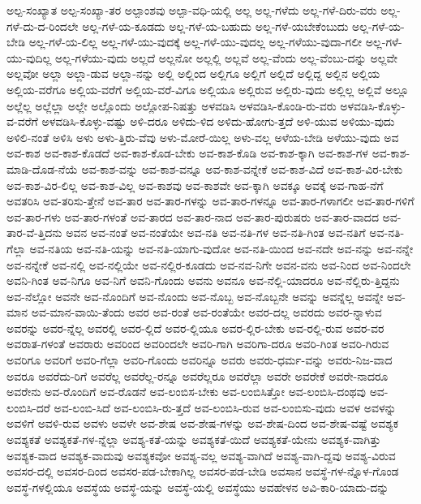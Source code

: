 {ಅಲ್ಪ-ಸಂಖ್ಯಾತ
ಅಲ್ಪ-ಸಂಖ್ಯಾ-ತರ
ಅಲ್ಪಾಂಶವು
ಅಲ್ಪಾ-ವಧಿ-ಯಲ್ಲಿ
ಅಲ್ಲ
ಅಲ್ಲ-ಗಳೆದು
ಅಲ್ಲ-ಗಳೆ-ದಿರು-ವರು
ಅಲ್ಲ-ಗಳೆ-ದು-ದ-ರಿಂದಲೇ
ಅಲ್ಲ-ಗಳೆ-ಯ-ಕೂಡದು
ಅಲ್ಲ-ಗಳೆ-ಯ-ಬಹುದು
ಅಲ್ಲ-ಗಳೆ-ಯಬೇಕೆಂಬುದು
ಅಲ್ಲ-ಗಳೆ-ಯ-ಬೇಡಿ
ಅಲ್ಲ-ಗಳೆ-ಯ-ಲಿಲ್ಲ
ಅಲ್ಲ-ಗಳೆ-ಯು-ವುದಕ್ಕೆ
ಅಲ್ಲ-ಗಳೆ-ಯು-ವುದಲ್ಲ
ಅಲ್ಲ-ಗಳೆಯು-ವುದಾ-ಗಲೀ
ಅಲ್ಲ-ಗಳೆ-ಯು-ವುದಿಲ್ಲ
ಅಲ್ಲ-ಗಳೆಯು-ವುದು
ಅಲ್ಲದೆ
ಅಲ್ಲನೋ
ಅಲ್ಲಲ್ಲಿ
ಅಲ್ಲವೆ
ಅಲ್ಲ-ವೆಂದು
ಅಲ್ಲ-ವೆಂಬು-ದನ್ನು
ಅಲ್ಲವೇ
ಅಲ್ಲವೋ
ಅಲ್ಲಾ
ಅಲ್ಲಾ-ಡುವ
ಅಲ್ಲಾ-ನನ್ನು
ಅಲ್ಲಿ
ಅಲ್ಲಿಂದ
ಅಲ್ಲಿಗೂ
ಅಲ್ಲಿಗೆ
ಅಲ್ಲಿದೆ
ಅಲ್ಲಿದ್ದ
ಅಲ್ಲಿನ
ಅಲ್ಲಿಯ
ಅಲ್ಲಿಯ-ವರೆಗೂ
ಅಲ್ಲಿಯ-ವರೆಗೆ
ಅಲ್ಲಿಯ-ವರೆ-ವಿಗೂ
ಅಲ್ಲಿಯೂ
ಅಲ್ಲಿರುವ
ಅಲ್ಲಿರು-ವುದು
ಅಲ್ಲಿಲ್ಲ
ಅಲ್ಲಿವೆ
ಅಲ್ಲೂ
ಅಲ್ಲೆಲ್ಲ
ಅಲ್ಲೆಲ್ಲಾ
ಅಲ್ಲೇ
ಅಲ್ಲೊಂದು
ಅಲ್ಲೋಪ-ನಿಷತ್ತು
ಅಳವಡಿಸಿ
ಅಳವಡಿಸಿ-ಕೊಂಡಿ-ರು-ವರು
ಅಳವಡಿಸಿ-ಕೊಳ್ಳು-ವ-ವರೆಗೆ
ಅಳವಡಿಸಿ-ಕೊಳ್ಳು-ವಷ್ಟು
ಅಳಿ-ದರೂ
ಅಳಿದು-ಳಿದ
ಅಳಿದು-ಹೋಗು-ತ್ತದೆ
ಅಳಿ-ಯುವ
ಅಳಿಯು-ವುದು
ಅಳಿಲಿ-ನಂತೆ
ಅಳಿಸಿ
ಅಳು
ಅಳು-ತ್ತಿರು-ವೆವು
ಅಳು-ಮೋರೆ-ಯಿಲ್ಲ
ಅಳು-ವಲ್ಲ
ಅಳೆಯ-ಬೇಡಿ
ಅಳೆಯು-ವುದು
ಅವ
ಅವ-ಕಾಶ
ಅವ-ಕಾಶ-ಕೊಡದೆ
ಅವ-ಕಾಶ-ಕೊಡ-ಬೇಕು
ಅವ-ಕಾಶ-ಕೊಡಿ
ಅವ-ಕಾಶ-ಕ್ಕಾಗಿ
ಅವ-ಕಾಶ-ಗಳ
ಅವ-ಕಾಶ-ಮಾಡಿ-ದೊಡ-ನೆಯೆ
ಅವ-ಕಾಶ-ವನ್ನು
ಅವ-ಕಾಶ-ವನ್ನೂ
ಅವ-ಕಾಶ-ವನ್ನೇಕೆ
ಅವ-ಕಾಶ-ವಿದೆ
ಅವ-ಕಾಶ-ವಿರ-ಬೇಕು
ಅವ-ಕಾಶ-ವಿರ-ಲಿಲ್ಲ
ಅವ-ಕಾಶ-ವಿಲ್ಲ
ಅವ-ಕಾಶವು
ಅವ-ಕಾಶವೇ
ಅವ-ಕ್ಕಾಗಿ
ಅವಕ್ಕೂ
ಅವಕ್ಕೆ
ಅವ-ಗಾಹ-ನೆಗೆ
ಅವತರಿಸಿ
ಅವ-ತರಿಸು-ತ್ತೇನೆ
ಅವ-ತಾರ
ಅವ-ತಾರ-ಗಳನ್ನು
ಅವ-ತಾರ-ಗಳನ್ನೂ
ಅವ-ತಾರ-ಗಳಾಗಲೀ
ಅವ-ತಾರ-ಗಳಿಗೆ
ಅವ-ತಾರ-ಗಳು
ಅವ-ತಾರ-ಗಳಂತೆ
ಅವ-ತಾರದ
ಅವ-ತಾರ-ನಾದ
ಅವ-ತಾರ-ಪುರುಷರು
ಅವ-ತಾರ-ವಾದದ
ಅವ-ತಾರ-ವೆ-ತ್ತಿದನು
ಅವನ
ಅವ-ನಂತೆ
ಅವ-ನಂತೆಯೇ
ಅವ-ನತಿ
ಅವ-ನತಿ-ಗಳ
ಅವ-ನತಿ-ಗಿಂತ
ಅವ-ನತಿಗೆ
ಅವ-ನತಿ-ಗೆಲ್ಲಾ
ಅವ-ನತಿಯ
ಅವ-ನತಿ-ಯನ್ನು
ಅವ-ನತಿ-ಯಾಗು-ವುದೋ
ಅವ-ನತಿ-ಯಿಂದ
ಅವ-ನದೇ
ಅವ-ನನ್ನು
ಅವ-ನನ್ನೇ
ಅವ-ನನ್ನೇಕೆ
ಅವ-ನಲ್ಲಿ
ಅವ-ನಲ್ಲಿಯೇ
ಅವ-ನಲ್ಲಿರ-ಕೂಡದು
ಅವ-ನವ-ನಿಗೇ
ಅವನ-ವನು
ಅವ-ನಿಂದ
ಅವ-ನಿಂದಲೇ
ಅವನಿ-ಗಿಂತ
ಅವ-ನಿಗೂ
ಅವ-ನಿಗೆ
ಅವನಿ-ಗೊಂದು
ಅವನು
ಅವನೂ
ಅವ-ನೆಲ್ಲಿ-ಯಾದರೂ
ಅವ-ನೆಲ್ಲಿರು-ತ್ತಿದ್ದನು
ಅವ-ನೆಲ್ಲೋ
ಅವನೇ
ಅವ-ನೊಂದಿಗೆ
ಅವ-ನೊಂದು
ಅವ-ನೊಬ್ಬ
ಅವ-ನೊಬ್ಬನೇ
ಅವನ್ನು
ಅವನ್ನೆಲ್ಲ
ಅವನ್ನೇ
ಅವ-ಮಾನ
ಅವ-ಮಾನ-ವಾಯಿ-ತೆಂದು
ಅವರ
ಅವ-ರಂತೆ
ಅವ-ರಂತೆಯೇ
ಅವರ-ದಲ್ಲ
ಅವರದು
ಅವರ-ನ್ನಾಳುವ
ಅವರನ್ನು
ಅವರ-ನ್ನೆಲ್ಲ
ಅವರಲ್ಲಿ
ಅವರ-ಲ್ಲಿದೆ
ಅವರ-ಲ್ಲಿಯೂ
ಅವರ-ಲ್ಲಿರ-ಬೇಕು
ಅವ-ರಲ್ಲಿ-ರುವ
ಅವರ-ವರ
ಅವರಾತ-ಗಳಂತೆ
ಅವರಾರು
ಅವರಿಂದ
ಅವರಿಂದಲೇ
ಅವರಿ-ಗಾಗಿ
ಅವರಿಗಾ-ದರೂ
ಅವರಿ-ಗಿಂತ
ಅವರಿ-ಗಿರುವ
ಅವರಿಗೂ
ಅವರಿಗೆ
ಅವರಿ-ಗೆಲ್ಲಾ
ಅವರಿ-ಗೊಂದು
ಅವರಿನ್ನೂ
ಅವರು
ಅವರು-ಧರ್ಮ-ವನ್ನು
ಅವರು-ನಿಜ-ವಾದ
ಅವರೂ
ಅವರೆದು-ರಿಗೆ
ಅವರೆಲ್ಲ
ಅವರೆಲ್ಲ-ರನ್ನೂ
ಅವರೆಲ್ಲರೂ
ಅವರೆಲ್ಲಾ
ಅವರೇ
ಅವರೇಕೆ
ಅವರೇ-ನಾದರೂ
ಅವರೇನು
ಅವ-ರೊಂದಿಗೆ
ಅವ-ರೊಡನೆ
ಅವ-ಲಂಬಿಸ-ಬೇಕು
ಅವ-ಲಂಬಿಸಿತ್ತೋ
ಅವ-ಲಂಬಿಸಿ-ದಂಥವು
ಅವ-ಲಂಬಿಸಿ-ದರೆ
ಅವ-ಲಂಬಿ-ಸಿದೆ
ಅವ-ಲಂಬಿಸಿ-ರು-ತ್ತದೆ
ಅವ-ಲಂಬಿಸಿ-ರುವ
ಅವ-ಲಂಬಿಸು-ವುದು
ಅವಳ
ಅವಳನ್ನು
ಅವಳಿಗೆ
ಅವಳಿ-ರುವ
ಅವಳು
ಅವಳೇ
ಅವ-ಶೇಷ
ಅವ-ಶೇಷ-ಗಳನ್ನು
ಅವ-ಶೇಷ-ದಿಂದ
ಅವ-ಶೇಷ-ವಷ್ಟೆ
ಅವಶ್ಯಕ
ಅವಶ್ಯಕತೆ
ಅವಶ್ಯಕತೆ-ಗಳ-ನ್ನೆಲ್ಲಾ
ಅವಶ್ಯ-ಕತೆ-ಯನ್ನು
ಅವಶ್ಯಕತೆ-ಯಿದೆ
ಅವಶ್ಯಕತೆ-ಯೇನು
ಅವಶ್ಯಕ-ವಾಗಿತ್ತು
ಅವಶ್ಯಕ-ವಾದ
ಅವಶ್ಯಕ-ವಾದುವು
ಅವಶ್ಯಕವೋ
ಅವಶ್ಯ-ವಲ್ಲ
ಅವಶ್ಯ-ವಾಗಿದೆ
ಅವಶ್ಯ-ವಾಗಿ-ದ್ದವು
ಅವಶ್ಯ-ವಿರುವ
ಅವಸರ-ದಲ್ಲಿ
ಅವಸರ-ದಿಂದ
ಅವಸರ-ಪಡ-ಬೇಕಾಗಿಲ್ಲ
ಅವಸರ-ಪಡ-ಬೇಡಿ
ಅವಸಾನ
ಅವಸ್ಥೆ-ಗಳ-ನ್ನೊಳ-ಗೊಂಡ
ಅವಸ್ಥೆ-ಗಳಲ್ಲಿಯೂ
ಅವಸ್ಥೆಯ
ಅವಸ್ಥೆ-ಯನ್ನು
ಅವಸ್ಥೆ-ಯಲ್ಲಿ
ಅವಸ್ಥೆಯು
ಅವಹೇಳನ
ಅವಿ-ಕಾರಿ-ಯಾದು-ದನ್ನು
}
